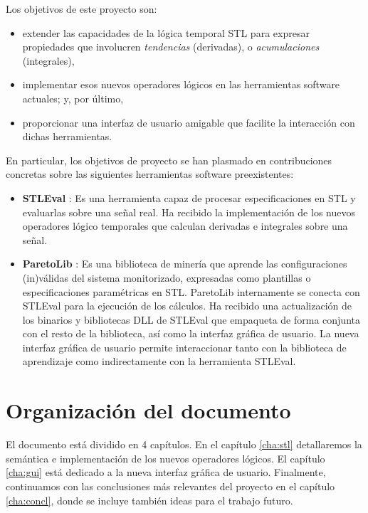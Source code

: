 Los objetivos de este proyecto son:

\begin{itemize}
\item extender las capacidades de la lógica temporal STL para expresar propiedades que involucren \textit{tendencias} (derivadas), o \textit{acumulaciones} (integrales),    
\item implementar esos nuevos operadores lógicos en las herramientas software actuales; y, por último,
\item proporcionar una interfaz de usuario amigable que facilite la interacción con dichas herramientas.  
\end{itemize}

En particular, los objetivos de proyecto se han plasmado en contribuciones concretas sobre las siguientes herramientas software preexistentes:

\begin{itemize}
\item \textbf{STLEval} \cite{StlEval}: Es una herramienta capaz de procesar especificaciones en STL y evaluarlas sobre una señal real. Ha recibido la implementación de los nuevos operadores lógico temporales que calculan derivadas e integrales sobre una señal.
\item \textbf{ParetoLib} \cite{ParetoLib}: Es una biblioteca de minería que aprende las configuraciones (in)válidas del sistema monitorizado, expresadas como plantillas o especificaciones paramétricas en STL. ParetoLib internamente se conecta con STLEval para la ejecución de los cálculos. Ha recibido una actualización de los binarios y bibliotecas DLL de STLEval que empaqueta de forma conjunta con el resto de la biblioteca, así como la interfaz gráfica de usuario. La nueva interfaz gráfica de usuario permite interaccionar tanto con la biblioteca de aprendizaje como indirectamente con la herramienta STLEval.
\end{itemize}

\section{Organización del documento}

El documento está dividido en 4 capítulos. En el capítulo \ref{cha:stl} detallaremos la semántica e implementación de los nuevos operadores lógicos. El capítulo \ref{cha:gui} está dedicado a la nueva interfaz gráfica de usuario. Finalmente, continuamos con las conclusiones más relevantes del proyecto en el capítulo \ref{cha:concl}, donde se incluye también ideas para el trabajo futuro. %

